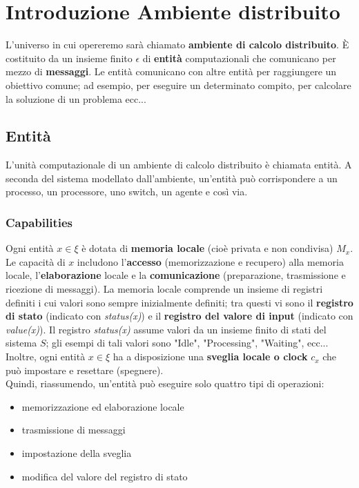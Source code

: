 \setlength{\headheight}{24.1278pt}
\linespread{1.6}
\chapter{Introduzione Ambiente distribuito}

L'universo in cui opereremo sarà chiamato \textbf{ambiente di calcolo distribuito}. È costituito da un insieme finito $\epsilon$ di \textbf{entità} computazionali che comunicano per mezzo di \textbf{messaggi}. Le entità comunicano con altre entità per raggiungere un obiettivo comune; ad esempio, per eseguire un determinato compito, per calcolare la soluzione di un problema ecc...

\section{Entità}
L'unità computazionale di un ambiente di calcolo distribuito è chiamata entità. A seconda del sistema modellato dall'ambiente, un'entità può corrispondere a un processo, un processore, uno switch, un agente e così via.

\subsection*{Capabilities}
Ogni entità $x \in \xi$ è dotata di \textbf{memoria locale} (cioè privata e non condivisa) $M_x$. Le capacità di $x$ includono l'\textbf{accesso} (memorizzazione e recupero) alla memoria locale, l'\textbf{elaborazione} locale e la \textbf{comunicazione} (preparazione, trasmissione e ricezione di messaggi). La memoria locale comprende un insieme di registri definiti i cui valori sono sempre inizialmente definiti; tra questi vi sono il \textbf{registro di stato} (indicato con \textit{status(x)}) e il \textbf{registro del valore di input} (indicato con \textit{value(x)}). Il registro \textit{status(x)} assume valori da un insieme finito di stati del sistema $S$; gli esempi di tali valori sono "Idle", "Processing", "Waiting", ecc...\\
Inoltre, ogni entità $x \in \xi$ ha a disposizione una \textbf{sveglia locale o clock} $c_x$ che può impostare e resettare (spegnere).\\
Quindi, riassumendo, un'entità può eseguire solo quattro tipi di operazioni:
\begin{itemize}
    \item memorizzazione ed elaborazione locale
    \item trasmissione di messaggi
    \item impostazione della sveglia
    \item modifica del valore del registro di stato
\end{itemize}

